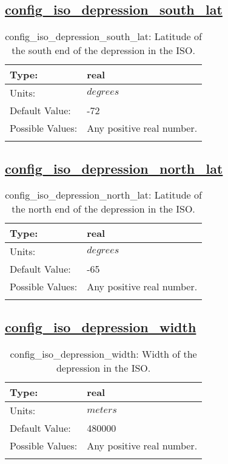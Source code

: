 \subsection[config\_iso\_depression\_south\_lat]{\hyperref[sec:nm_tab_iso]{config\_iso\_depression\_south\_lat}}
\label{subsec:nm_sec_config_iso_depression_south_lat}
\begin{center}
\begin{longtable}{| p{2.0in} || p{4.0in} |}
    \hline
    Type: & real \\
    \hline
    Units: & $degrees$ \\
    \hline
    Default Value: & -72 \\
    \hline
    Possible Values: & Any positive real number. \\
    \hline
    \caption{config\_iso\_depression\_south\_lat: Latitude of the south end of the depression in the ISO.}
\end{longtable}
\end{center}
\subsection[config\_iso\_depression\_north\_lat]{\hyperref[sec:nm_tab_iso]{config\_iso\_depression\_north\_lat}}
\label{subsec:nm_sec_config_iso_depression_north_lat}
\begin{center}
\begin{longtable}{| p{2.0in} || p{4.0in} |}
    \hline
    Type: & real \\
    \hline
    Units: & $degrees$ \\
    \hline
    Default Value: & -65 \\
    \hline
    Possible Values: & Any positive real number. \\
    \hline
    \caption{config\_iso\_depression\_north\_lat: Latitude of the north end of the depression in the ISO.}
\end{longtable}
\end{center}
\subsection[config\_iso\_depression\_width]{\hyperref[sec:nm_tab_iso]{config\_iso\_depression\_width}}
\label{subsec:nm_sec_config_iso_depression_width}
\begin{center}
\begin{longtable}{| p{2.0in} || p{4.0in} |}
    \hline
    Type: & real \\
    \hline
    Units: & $meters$ \\
    \hline
    Default Value: & 480000 \\
    \hline
    Possible Values: & Any positive real number. \\
    \hline
    \caption{config\_iso\_depression\_width: Width of the depression in the ISO.}
\end{longtable}
\end{center}
